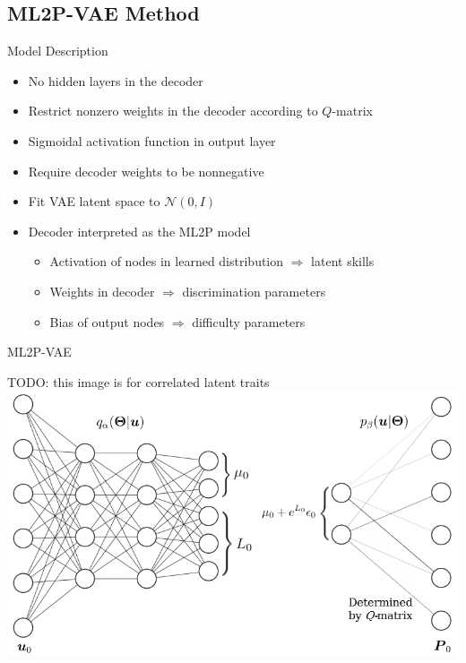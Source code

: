 \documentclass{beamer}
\theoremstyle{definition}
\begin{document}
\subsection{ML2P-VAE Method}

\begin{frame}{Model Description}
\begin{itemize}
\item No hidden layers in the decoder
\item<2-> Restrict nonzero weights in the decoder according to $Q$-matrix
\item<3-> Sigmoidal activation function in output layer
\item<4-> Require decoder weights to be nonnegative
\item<5-> Fit VAE latent space to $\mathcal{N}(0, I)$
\item<6-> Decoder interpreted as the ML2P model
  \begin{itemize}
    \item<6-> Activation of nodes in learned distribution $\Rightarrow$ latent skills
    \item<6-> Weights in decoder $\Rightarrow$ discrimination parameters
    \item<6-> Bias of output nodes $\Rightarrow$ difficulty parameters
  \end{itemize}
\end{itemize}
\end{frame}

\begin{frame}{ML2P-VAE}
\begin{center}
  TODO: this image is for correlated latent traits
  \includegraphics[scale=0.45]{../img/ml2pvae_visual.png}
\end{center}
\end{frame}
\end{document}
